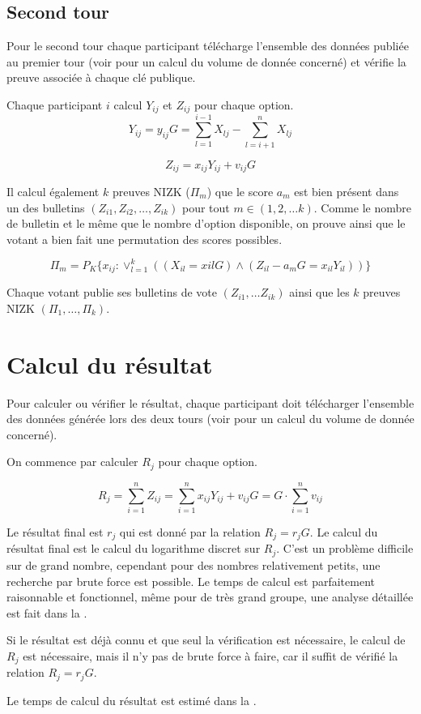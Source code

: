 \documentclass[../report]{subfiles}
\begin{document}
\subsection{Second tour}

Pour le second tour chaque participant télécharge l'ensemble des données publiée au premier 
tour (voir  pour un calcul du volume de donnée concerné) et vérifie la
preuve associée à chaque clé publique.

Chaque participant $i$ calcul $Y_{ij}$ et $Z_{ij}$ pour chaque option.
\[
	Y_{ij} = y_{ij} G = \sum_{l=1}^{i-1} X_{lj} - \sum_{l=i+1}^{n} X_{lj}
\]

\[
	Z_{ij} = x_{ij} Y_{ij} + v_{ij} G
\]

Il calcul également $k$ preuves NIZK ($\Pi_m$) que le score $a_{m}$ est bien présent dans un des bulletins 
$(Z_{i1}, Z_{i2}, \dots, Z_{ik})$ pour tout $m \in (1, 2, \dots k)$.
Comme le nombre de bulletin et le même que le nombre d'option disponible, on prouve ainsi
que le votant a bien fait une permutation des scores possibles.

\[
\Pi_m = P_K\{x_{ij}: \vee_{l=1}^{k} ((X_{il} = x{il} G) \wedge (Z_{il} - a_{m}G = x_{il} Y_{il}) )\}
\]

Chaque votant publie ses bulletins de vote $(Z_{i1}, \dots Z_{ik})$ ainsi que les $k$ preuves NIZK $(\Pi_1, \dots, \Pi_k)$.


\section{Calcul du résultat}\label{sec:res:proto:resultat}

Pour calculer ou vérifier le résultat, chaque participant doit télécharger l'ensemble des données générée lors des 
deux tours (voir  pour un calcul du volume de donnée concerné).

On commence par calculer $R_j$ pour chaque option.

\[
	R_j = \sum_{i=1}^{n} Z_{ij} = \sum_{i=1}^{n} x_{ij}Y_{ij} + v_{ij}G = G \cdot \sum_{i=1}^{n} v_{ij}
\]

Le résultat final est $r_j$ qui est donné par la relation $R_j = r_j G$.
Le calcul du résultat final est le calcul du logarithme discret sur $R_j$.
C'est un problème difficile sur de grand nombre, cependant pour des nombres 
relativement petits, une recherche par brute force est possible.
Le temps de calcul est parfaitement raisonnable et fonctionnel, même pour de très grand groupe, 
une analyse détaillée est fait dans la .

Si le résultat est déjà connu et que seul la vérification est nécessaire, le calcul de $R_j$ est nécessaire, mais il n'y
pas de brute force à faire, car il suffit de vérifié la relation $R_j = r_j G$.

Le temps de calcul du résultat est estimé dans la .
\end{document}
